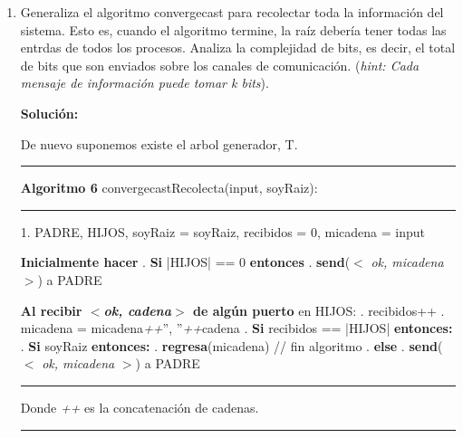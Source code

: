 \documentclass[8pt, letterpaper]{article}
\begin{document}
\begin{enumerate}
  \hfill\break
  Recordemos que en flooding los mensajes rebotan, si bien los procesos que
  ya enviaron el mensaje solo lo hacen una vez, estos escuchan el mensaje
  $n$ veces, donde $n$ es el número de puertos a los que está conectado.

  Ahora no podemos garantizar que todo elemento reciba el mensaje, pues
  es solo para procesos $p$ tales que $d(raiz, p) \leq d$

  En la clase habiamos considerado las aristas como bidireccionales
  de forma que ahora no necesariamente se envian $2|E|$ mensajes. Considere
  el siguiente conjunto
  $$E' = \{uv|\  d(raiz, u) \leq d \land d(raiz, v)\leq d\}$$
  Así, si seguimos considerando bidireccionales las aristas se envian $2|E'|$
  mensajes.

  Nota: Para que se envien $2|E|$ aristas se debe cumplir que para cualquier
  vertice , $v$, $d(raiz, v) \leq d$.
  \hfill\break
  \rmfamily
\item Generaliza el algoritmo convergecast para recolectar toda la información
  del sistema. Esto es, cuando el algoritmo termine, la raíz debería tener
  todas las entrdas de todos los procesos. Analiza la complejidad de bits,
  es decir, el total de bits que son enviados sobre los canales de
  comunicación. (\textit{hint: Cada mensaje de información puede tomar k bits}).
  
  \hfill\break
  \ttfamily
  {\bf Solución:}

  De nuevo suponemos existe el arbol generador, T.
  
  \rule{1\textwidth}{0.2mm}
  {\bf Algoritmo 6} convergecastRecolecta(input, soyRaiz):
  \hfill\break
  \rule{1\textwidth}{0.2mm}
  1. PADRE, HIJOS, soyRaiz = soyRaiz, recibidos = 0, micadena = input
  
  \hfill\break
  \hspace*{.2cm} {\bf Inicialmente hacer}
  \hfill{}. {\bf Si} |HIJOS| == 0 {\bf entonces}
  \hfill{}. \hspace{0.5cm} {\bf send}($<$ \textit{ok, micadena} $>$) a PADRE
  \hfill\break
  
  \hspace{0.2cm} {\bf Al recibir $<${\it ok, cadena}$>$ de algún puerto}
  en HIJOS:
  \hfill{}. recibidos++
  \hfill{}. micadena = micadena{\it ++}'', ''{\it ++}cadena
  \hfill{}. {\bf Si} recibidos == |HIJOS| {\bf entonces:}
  \hfill{}. \hspace{0.5cm} {\bf Si} soyRaiz {\bf entonces:}
  \hfill{}. \hspace{1cm} {\bf regresa}(micadena) // fin algoritmo
  \hfill{}. \hspace{0.5cm} {\bf else}
  \hfill{}. \hspace{1cm} {\bf send}($<$ \textit{ok, micadena} $>$) a PADRE
  \hfill\break
  \rule{1\textwidth}{0.2mm}
  Donde {\it ++} es la concatenación de cadenas.
  \hfill\break
  \rule{1\textwidth}{0.2mm}


\end{enumerate}
\end{document}

